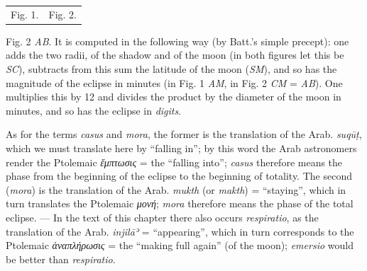 \documentclass[11pt]{article}
\newcommand{\Pg}[1]{\marginpar{\footnotesize\color{gray}#1}}
\begin{document}
\begin{center}\small\begin{tabular}{cc}
Fig. 1.\footnotemarkT{} & Fig. 2. \\
\end{tabular}\end{center}
\addtocounter{footnoteT}{-1}
\par Fig. 2 \emph{AB}. It is computed in the following way (by Batt.'s simple precept): one adds the two radii, of the shadow and of the moon (in both figures let this be \emph{SC}), subtracts from this sum the latitude of the moon (\emph{SM}), and so has the magnitude of the eclipse in minutes (in Fig. 1 \emph{AM}, in Fig. 2 \emph{CM} = \emph{AB}). One multiplies this by 12 and divides the product by the diameter of the moon in minutes, and so has the eclipse in \emph{digits}.\par
\par \Pg{88}As for the terms \emph{casus} and \emph{mora}, the former is the translation of the Arab. \emph{suqūṭ}, which we must translate here by “falling in”; by this word the Arab astronomers render the Ptolemaic \emph{{\greekfont ἔμπτωσις}} = the “falling into”; \emph{casus} therefore means the phase from the beginning of the eclipse to the beginning of totality. The second (\emph{mora}) is the translation of the Arab. \emph{mukth} (or \emph{makth}) = “staying”, which in turn translates the Ptolemaic \emph{{\greekfont μονή}}; \emph{mora} therefore means the phase of the total eclipse. — In the text of this chapter there also occurs \emph{respiratio}, as the translation of the Arab. \emph{injilāʾ} = “appearing”, which in turn corresponds to the Ptolemaic \emph{{\greekfont ἀναπλήρωσις}} = the “making full again” (of the moon); \emph{emersio} would be better than \emph{respiratio}.\par
\end{document}
